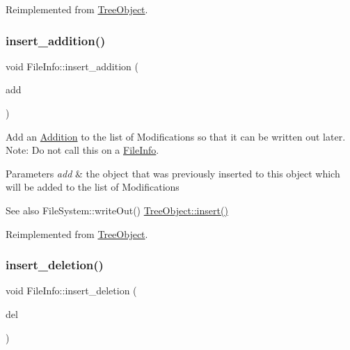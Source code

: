 Reimplemented from \mbox{\hyperlink{classTreeObject_af8cc57edba9f435b52ccf33cfbbb2fc6}{Tree\+Object}}.

\mbox{\label{classFileInfo_a7f788f31521c535646eebfa9959bbb24}} 
\subsubsection{\texorpdfstring{insert\+\_\+addition()}{insert\_addition()}}
{\footnotesize\ttfamily void File\+Info\+::insert\+\_\+addition (\begin{DoxyParamCaption}\item[{\mbox{\hyperlink{classTreeObject}{Tree\+Object}} $\ast$}]{add }\end{DoxyParamCaption})\hspace{0.3cm}{\ttfamily [virtual]}}

Add an \mbox{\hyperlink{classAddition}{Addition}} to the list of Modifications so that it can be written out later. Note\+: Do not call this on a \mbox{\hyperlink{classFileInfo}{File\+Info}}. 
\begin{DoxyParams}{Parameters}
{\em add} & the object that was previously inserted to this object which will be added to the list of Modifications \\
\hline
\end{DoxyParams}
\begin{DoxySeeAlso}{See also}
File\+System\+::write\+Out() \mbox{\hyperlink{classTreeObject_af8cc57edba9f435b52ccf33cfbbb2fc6}{Tree\+Object\+::insert()}} 
\end{DoxySeeAlso}


Reimplemented from \mbox{\hyperlink{classTreeObject_a41ce6080e0df5adcea4b0a76d35af885}{Tree\+Object}}.

\mbox{\label{classFileInfo_a278136b1d68f55dc56a4be807076fc0d}} 
\subsubsection{\texorpdfstring{insert\+\_\+deletion()}{insert\_deletion()}}
{\footnotesize\ttfamily void File\+Info\+::insert\+\_\+deletion (\begin{DoxyParamCaption}\item[{\mbox{\hyperlink{classTreeObject}{Tree\+Object}} $\ast$}]{del }\end{DoxyParamCaption})\hspace{0.3cm}{\ttfamily [virtual]}}

